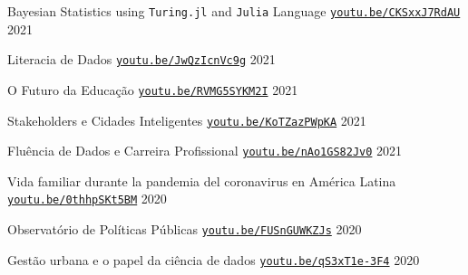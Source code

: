

\begin{cventries}

  \cventry
    {} %
    {Bayesian Statistics using \texttt{Turing.jl} and \texttt{Julia} Language} %
    {\href{https://youtu.be/CKSxxJ7RdAU}{\texttt{youtu.be/CKSxxJ7RdAU}}} %
    {2021} %
    {}

  \cventry
    {} %
    {Literacia de Dados} %
    {\href{https://youtu.be/JwQzIcnVc9g}{\texttt{youtu.be/JwQzIcnVc9g}}} %
    {2021} %
    {}

  \cventry
    {} %
    {O Futuro da Educação} %
    {\href{https://youtu.be/RVMG5SYKM2I}{\texttt{youtu.be/RVMG5SYKM2I}}} %
    {2021} %
    {}

  \cventry
    {} %
    {Stakeholders e Cidades Inteligentes} %
    {\href{https://youtu.be/KoTZazPWpKA}{\texttt{youtu.be/KoTZazPWpKA}}} %
    {2021} %
    {}

  \cventry
    {} %
    {Fluência de Dados e Carreira Profissional} %
    {\href{https://youtu.be/nAo1GS82Jv0}{\texttt{youtu.be/nAo1GS82Jv0}}} %
    {2021} %
    {}

  \cventry
    {} %
    {Vida familiar durante la pandemia del coronavirus en América Latina} %
    {\href{https://youtu.be/0thhpSKt5BM}{\texttt{youtu.be/0thhpSKt5BM}}} %
    {2020} %
    {}

  \cventry
    {} %
    {Observatório de Políticas Públicas} %
    {\href{https://youtu.be/FUSnGUWKZJs}{\texttt{youtu.be/FUSnGUWKZJs}}} %
    {2020} %
    {}

  \cventry
    {} %
    {Gestão urbana e o papel da ciência de dados} %
    {\href{https://youtu.be/qS3xT1e-3F4}{\texttt{youtu.be/qS3xT1e-3F4}}} %
    {2020} %
    {}


\end{cventries}
